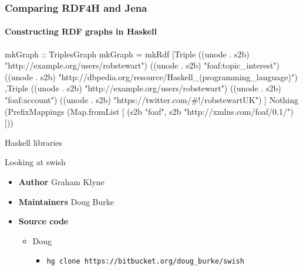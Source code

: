\documentclass{beamer}
\begin{document}
\begin{frame}[fragile]
\frametitle{Comparing RDF4H and Jena}
\framesubtitle{Constructing RDF graphs in Haskell}


\begin{haskellcode}
mkGraph :: TriplesGraph
mkGraph = mkRdf 
  [Triple
    ((unode . s2b) "http://example.org/users/robstewart")
    ((unode . s2b) "foaf:topic_interest")
    ((unode . s2b) "http://dbpedia.org/resource/Haskell_(programming_language)")
  ,Triple
    ((unode . s2b) "http://example.org/users/robstewart")
    ((unode . s2b) "foaf:account")
    ((unode . s2b) "https://twitter.com/#!/robstewartUK")
  ]
  Nothing
  (PrefixMappings
    (Map.fromList [ (s2b "foaf", s2b "http://xmlns.com/foaf/0.1/") ]))
\end{haskellcode}

\end{frame}


\begin{frame}

\huge
\begin{center}
Haskell libraries
\end{center}

\large
\begin{center}
Looking at swish
\end{center}

\begin{itemize}
\item \textbf{Author} Graham Klyne
\item \textbf{Maintainers} Doug Burke
\item \textbf{Source code}
  
  \begin{itemize}
  \item Doug
    
    \begin{itemize}
    \item \texttt{hg clone https://bitbucket.org/doug\_burke/swish}
    \end{itemize}
    
  \end{itemize}
  
\end{itemize}

\end{frame}
\end{document}
